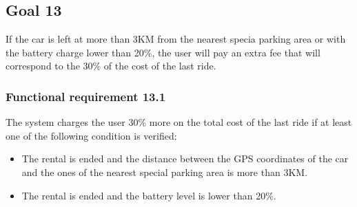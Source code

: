 \subsection{Goal 13}
If the car is left at more than 3KM from the nearest specia parking area or with the battery charge lower than 20\%, the user will pay an extra fee that will correspond to the 30\% of the cost of the last ride.

\setcounter{secnumdepth}{3}
\subsubsection{Functional requirement 13.1}
The system charges the user 30\% more on the total cost of the last ride if at least one of the following condition is verified:
\begin{itemize}
	\item The rental is ended and the distance between the GPS coordinates of the car and the ones of the nearest special parking area is more than 3KM.
	\item The rental is ended and the battery level is lower than 20\%.
\end{itemize}
